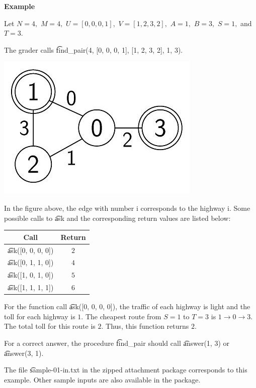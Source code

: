 \bf{Example}

Let $N=4,$ $M=4,$ $U=[0,0,0,1],$ $V=[1,2,3,2],$ $A=1,$ $B=3,$ $S=1,$ and $T=3.$

The grader calls \t{find_pair(4, [0, 0, 0, 1], [1, 2, 3, 2], 1, 3).}

\includegraphics{image0.jpg}

In the figure above, the edge with number i corresponds to the highway i. Some possible calls to \t{ask} and the corresponding return values are listed below:

\begin{tabular}{|c|c|} \hline
\bf{Call}&\bf{Return} \\\hline
\t{ask([0, 0, 0, 0])}&$2$ \\\hline
\t{ask([0, 1, 1, 0])}&$4$ \\\hline
\t{ask([1, 0, 1, 0])}&$5$ \\\hline
\t{ask([1, 1, 1, 1])}&$6$ \\\hline
\end{tabular}

For the function call \t{ask([0, 0, 0, 0])}, the traffic of each highway is light and the toll for each highway is $1.$ The cheapest route from $S=1$ to $T=3$ is $1 \rightarrow 0 \rightarrow 3.$ The total toll for this route is $2.$ Thus, this function returns $2.$

For a correct answer, the procedure \t{find_pair} should call \t{answer(1, 3)} or \t{answer(3, 1)}.

The file \t{sample-01-in.txt} in the zipped attachment package corresponds to this example. Other sample inputs are also available in the package.

